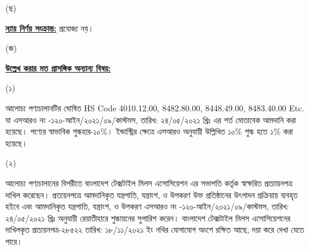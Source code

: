 \documentclass[12pt]{article}
\newcommand{\hscode}{4010.12.00, 8482.80.00, 8448.49.00, 8483.40.00 Etc.}
\newcommand{\srooot}{এসআরও নং -১২০-আইন/২০২১/০৯/কাস্টমস}
\newcommand{\sroootd}{তারিখ: ২৪/০৫/২০২১ খ্রিঃ}
\begin{document}
\begin{minipage}[t]{0.05\linewidth}
\hspace{1em}
\end{minipage}
\begin{minipage}[t]{0.05\linewidth}
(ছ)
\end{minipage}
\begin{minipage}[t]{0.90\linewidth}
\underline{\textbf{ন্যায় নির্ণয় সংক্রান্ত:}} প্রযোজ্য নয়।
\\
\end{minipage}
\begin{minipage}[t]{0.05\linewidth}
\hspace{1em}
\end{minipage}
\begin{minipage}[t]{0.05\linewidth}
(জ)
\end{minipage}
\begin{minipage}[t]{0.05\linewidth}
\end{minipage}
\begin{minipage}[t]{0.90\linewidth}
\underline{\textbf{উল্লেখ করার মত প্রাসঙ্গিক অন্যান্য বিষয়:}}
\end{minipage}
\begin{minipage}[t]{0.05\linewidth}
\hspace{1em}
\end{minipage}
\begin{minipage}[t]{0.05\linewidth}
\hspace{1em}
\end{minipage}
\begin{minipage}[t]{0.05\linewidth}
(১)
\end{minipage}
\begin{minipage}[t]{0.85\linewidth}
আলোচ্য পণ্যচালানটির ঘোষিত HS Code {\hscode}
যা {\srooot}, {\sroootd} এর শর্ত মোতাবেক
আমদানি করা হয়েছে। পণ্যের স্বাভাবিক শুল্কহার-১০\%।
ইন্ডাস্ট্রির ক্ষেত্রে এসআরও অনুযায়ী উল্লিখিত
১০\% শুল্ক হতে ১\% করা হয়েছে।
\end{minipage}
\begin{minipage}[t]{0.05\linewidth}
\hspace{1em}
\end{minipage}
\begin{minipage}[t]{0.05\linewidth}
\hspace{1em}
\end{minipage}
\begin{minipage}[t]{0.05\linewidth}
(২)
\end{minipage}
\begin{minipage}[t]{0.85\linewidth}
আলোচ্য পণ্যচালানের বিপরীতে বাংলাদেশ
টেক্সটাইল মিলস এসোসিয়েশন এর সভাপতি
কর্তৃক স্বাক্ষরিত প্রত্যায়নপত্র
দাখিল করেছেন। প্রত্যয়নপত্রে আমদানিকৃত
যন্ত্রপাতি, যন্ত্রাংশ, ও উপকরণ
উক্ত প্রতিষ্ঠানের উৎপাদন প্রক্রিয়ায়
ব্যবহৃত হইবে এবং আমদানিকৃত
যন্ত্রপাতি, যন্ত্রাংশ, ও উপকরণ
{\srooot}, {\sroootd} অনুযায়ী
রেয়াতীহারে শুল্কায়নের সুপারিশ
করেন। বাংলাদেশ টেক্সটাইল মিলস
এসোসিয়েশনের দাখিলকৃত প্রত্যয়নপত্র-২৮৫২২
তারিখ: ১৮/১১/২০২১ ইং নথির যোগাযোগ অংশে রক্ষিত
আছে, দয়া করে দেখা যেতে পারে।
\end{minipage}
\end{document}
